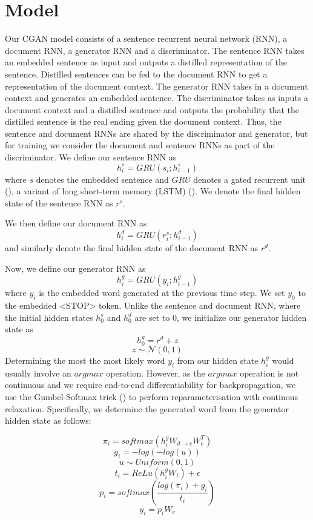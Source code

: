 \documentclass{article}
\begin{document}
\section{Model}
Our CGAN model consists of a sentence recurrent neural network (RNN), a document RNN, a generator RNN and a discriminator. The sentence RNN takes an embedded sentence as input and outputs a distilled representation of the sentence. Distilled sentences can be fed to the document RNN to get a representation of the document context. The generator RNN takes in a document context and generates an embedded sentence. The discriminator takes as inputs a document context and a distilled sentence and outputs the probability that the distilled sentence is the real ending given the document context. Thus, the sentence and document RNNs are shared by the discriminator and generator, but for training we consider the document and sentence RNNs as part of the discriminator.
We define our sentence RNN as
$$ h^{s}_{i} = GRU(s_{i}; h^{s}_{i-1})$$
where $s$ denotes the embedded sentence and $GRU$ denotes a gated recurrent unit (\cite{DBLP:journals/corr/ChoMGBSB14}), a variant of long short-term memory (LSTM) (\cite{articffle}). We denote the final hidden state of the sentence RNN as $r^{s}$.

We then define our document RNN as
$$ h^{d}_{i} = GRU(r^{s}_{i}; h^{d}_{i-1}) $$
and similarly denote the final hidden state of the document RNN as $r^{d}$.

Now, we define our generator RNN as
$$ h^{g}_{i} = GRU(y_{i}; h^{g}_{i-1}) $$
where $y_{i}$ is the embedded word generated at the previous time step. We set $y_{0}$ to the embedded <STOP> token. Unlike the sentence and document RNN, where the initial hidden states $h^{s}_{0}$ and $h^{d}_{0}$ are set to 0, we initialize our generator hidden state as
$$ h^{g}_{0} = r^{d} + z $$
$$ z \sim \mathcal{N}(0,1) $$
Determining the most the most likely word $y_{i}$ from our hidden state $h^{g}_{i}$ would usually involve an $argmax$ operation. However, as the $argmax$ operation is not continuous and we require end-to-end differentiability for backpropagation, we use the Gumbel-Softmax trick (\cite{2016arXiv161101144J}) to perform reparameterisation with continous relaxation. Specifically, we determine the generated word from the generator hidden state as follows:

$$ \pi_{i} = softmax(h^{g}_{i}W_{d \rightarrow e}W_{e}^{T})$$
$$ g_{i} = -log(-log(u)) $$
$$ u \sim Uniform(0,1) $$
$$ t_{i} = ReLu(h^{g}_{i}W_{t}) + \epsilon $$
$$ p_{i} = softmax(\frac{log(\pi_{i}) + g_{i}}{t_{i}}) $$
$$ y_{i} = p_{i}W_{e}$$
\end{document}
